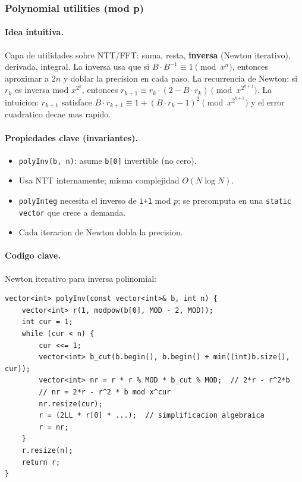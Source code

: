 ﻿\subsubsection{Polynomial utilities (mod p)}

\paragraph{Idea intuitiva.}
Capa de utilidades sobre NTT/FFT: suma, resta, \textbf{inversa} (Newton iterativo), derivada, integral. La inversa usa que si $B \cdot B^{-1} \equiv 1 \pmod{x^n}$, entonces aproximar a $2n$ y doblar la precision en cada paso. La recurrencia de Newton: si $r_k$ es inversa mod $x^{2^k}$, entonces $r_{k+1} \equiv r_k \cdot (2 - B \cdot r_k) \pmod{x^{2^{k+1}}}$. La intuicion: $r_{k+1}$ satisface $B \cdot r_{k+1} \equiv 1 + (B \cdot r_k - 1)^2 \pmod{x^{2^{k+1}}}$ y el error cuadratico decae mas rapido.

\paragraph{Propiedades clave (invariantes).}
\begin{itemize}\setlength\itemsep{0pt}
	\item \texttt{polyInv(b, n)}: asume \texttt{b[0]} invertible (no cero).
	\item Usa NTT internamente; misma complejidad $O(N \log N)$.
	\item \texttt{polyInteg} necesita el inverso de \texttt{i+1} mod $p$; se precomputa en una \texttt{static vector} que crece a demanda.
	\item Cada iteracion de Newton dobla la precision.
\end{itemize}

\paragraph{Codigo clave.}
Newton iterativo para inversa polinomial:
\begin{verbatim}
vector<int> polyInv(const vector<int>& b, int n) {
    vector<int> r(1, modpow(b[0], MOD - 2, MOD));
    int cur = 1;
    while (cur < n) {
        cur <<= 1;
        vector<int> b_cut(b.begin(), b.begin() + min((int)b.size(), cur));
        vector<int> nr = r * r % MOD * b_cut % MOD;  // 2*r - r^2*b
        // nr = 2*r - r^2 * b mod x^cur
        nr.resize(cur);
        r = (2LL * r[0] * ...);  // simplificacion algebraica
        r = nr;
    }
    r.resize(n);
    return r;
}
\end{verbatim}

